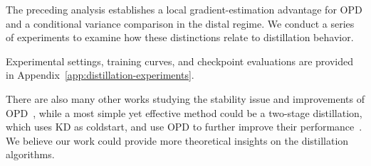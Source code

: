 The preceding analysis establishes a local gradient-estimation advantage for OPD and a conditional variance comparison in the distal regime. We conduct a series of experiments to examine how these distinctions relate to distillation behavior.

Experimental settings, training curves, and checkpoint evaluations are provided in Appendix~\ref{app:distillation-experiments}.

There are also many other works studying the stability issue and improvements of OPD~\citep{li_rethinking_2026, oh_kl_2026}, while a most simple yet effective method could be a two-stage distillation, which uses KD as coldstart, and use OPD to further improve their performance~\citep{yang_qwen3_2025}. We believe our work could provide more theoretical insights on the distillation algorithms.
